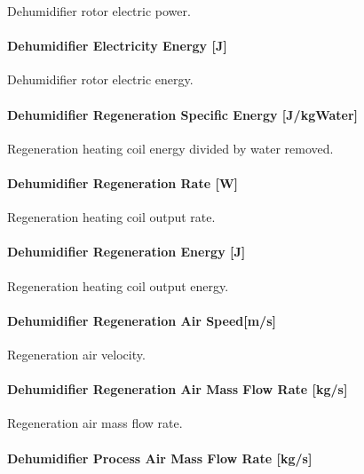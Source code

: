 Dehumidifier rotor electric power.

\paragraph{Dehumidifier Electricity Energy {[}J{]}}\label{dehumidifier-electric-energy-j}

Dehumidifier rotor electric energy.

\paragraph{Dehumidifier Regeneration Specific Energy {[}J/kgWater{]}}\label{dehumidifier-regeneration-specific-energy-jkgwater}

Regeneration heating coil energy divided by water removed.

\paragraph{Dehumidifier Regeneration Rate {[}W{]}}\label{dehumidifier-regeneration-rate-w}

Regeneration heating coil output rate.

\paragraph{Dehumidifier Regeneration Energy {[}J{]}}\label{dehumidifier-regeneration-energy-j}

Regeneration heating coil output energy.

\paragraph{Dehumidifier Regeneration Air Speed{[}m/s{]}}\label{dehumidifier-regeneration-air-speedms}

Regeneration air velocity.

\paragraph{Dehumidifier Regeneration Air Mass Flow Rate {[}kg/s{]}}\label{dehumidifier-regeneration-air-mass-flow-rate-kgs}

Regeneration air mass flow rate.

\paragraph{Dehumidifier Process Air Mass Flow Rate {[}kg/s{]}}\label{dehumidifier-process-air-mass-flow-rate-kgs}

